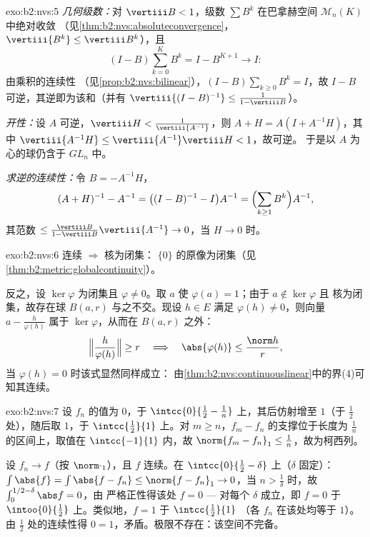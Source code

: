 \begin{solution}{exo:b2:nvs:5}
\emph{几何级数：}对 $\vertiii B < 1$，级数 $\sum
B^k$ 在巴拿赫空间 $\mathcal{M}_n(K)$ 中绝对收敛
（见\cref{thm:b2:nvs:absoluteconvergence}，$\vertiii{B^k} \leq
\vertiii B^k$），且
\[
(I - B)\sum_{k=0}^{K} B^k = I - B^{K+1} \longrightarrow I :
\]
由乘积的连续性
（见\cref{prop:b2:nvs:bilinear}），$(I - B)\sum_{k\geq0} B^k = I$，故
$I - B$ 可逆，其逆即为该和（并有
$\vertiii{(I-B)^{-1}} \leq \frac{1}{1 - \vertiii B}$）。

\emph{开性：}设 $A$ 可逆，$\vertiii H <
\frac{1}{\vertiii{A^{-1}}}$，则 $A + H = A(I + A^{-1}H)$，其中
$\vertiii{A^{-1}H} \leq \vertiii{A^{-1}}\vertiii H < 1$，故可逆。
于是以 $A$ 为心的球仍含于 $GL_n$ 中。

\emph{求逆的连续性：}令 $B = -A^{-1}H$，
\[
(A + H)^{-1} - A^{-1} = \bigl((I - B)^{-1} - I\bigr)A^{-1}
= \Bigl(\sum_{k \geq 1} B^k\Bigr) A^{-1},
\]
其范数 $\leq \frac{\vertiii B}{1 - \vertiii B}\vertiii{A^{-1}}
\to 0$，当 $H \to 0$ 时。
\end{solution}

\begin{solution}{exo:b2:nvs:6}
连续 $\Rightarrow$ 核为闭集：
$\{0\}$ 的原像为闭集（见\cref{thm:b2:metric:globalcontinuity}）。

反之，设 $\ker\varphi$ 为闭集且 $\varphi \neq 0$。取
$a$ 使 $\varphi(a) = 1$；由于 $a \notin \ker\varphi$ 且
核为闭集，故存在球 $B(a, r)$ 与之不交。现设 $h \in E$
满足 $\varphi(h) \neq 0$，则向量 $a - \frac{h}{\varphi(h)}$
属于 $\ker\varphi$，从而在 $B(a, r)$ 之外：
\[
\Bigl\Vert \frac{h}{\varphi(h)} \Bigr\Vert \geq r
\quad\Longrightarrow\quad
\abs{\varphi(h)} \leq \frac{\norm h}{r},
\]
当 $\varphi(h) = 0$ 时该式显然同样成立：
由\cref{thm:b2:nvs:continuouslinear}中的界(4)可知其连续。
\end{solution}

\begin{solution}{exo:b2:nvs:7}
设 $f_n$ 的值为 $0$，于 $\intcc{0}{\frac12 - \frac1n}$ 上，其后仿射增至
$1$（于 $\frac12$ 处），随后取 $1$，于 $\intcc{\frac12}{1}$ 上。对 $m
\geq n$，$f_m - f_n$ 的支撑位于长度为
$\frac1n$ 的区间上，取值在 $\intcc{-1}{1}$ 内，故 $\norm{f_m - f_n}_1 \leq
\frac1n$，故为柯西列。

设 $f_n \to f$（按 $\norm\cdot_1$），且 $f$ 连续。在
$\intcc{0}{\frac12 - \delta}$ 上（$\delta$ 固定）：$\int \abs{f} =
\int\abs{f - f_n} \leq \norm{f - f_n}_1 \to 0$，当 $n >
\frac1\delta$ 时，故 $\int_0^{1/2 - \delta}\abs f = 0$，由
严格正性得该处 $f = 0$ --- 对每个 $\delta$ 成立，即 $f = 0$ 于
$\intoo{0}{\frac12}$ 上。类似地，$f = 1$ 于 $\intcc{\frac12}{1}$
（各 $f_n$ 在该处均等于 $1$）。由 $\frac12$ 处的连续性得 $0 =
1$，矛盾。极限不存在：该空间不完备。
\end{solution}

